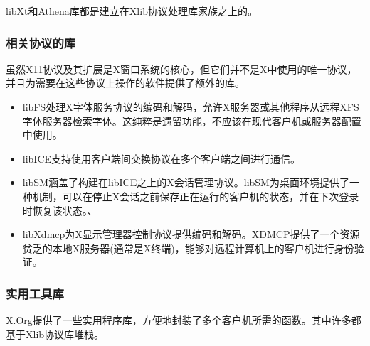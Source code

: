 \begin{note}
libXt和Athena库都是建立在Xlib协议处理库家族之上的。
\end{note}

\subsubsection{相关协议的库}

虽然X11协议及其扩展是X窗口系统的核心，但它们并不是X中使用的唯一协议，并且为需要在这些协议上操作的软件提供了额外的库。

\begin{itemize}
	\item libFS处理X字体服务协议的编码和解码，允许X服务器或其他程序从远程XFS字体服务器检索字体。这纯粹是遗留功能，不应该在现代客户机或服务器配置中使用。
	\item libICE支持使用客户端间交换协议在多个客户端之间进行通信。
	\item libSM涵盖了构建在libICE之上的X会话管理协议。libSM为桌面环境提供了一种机制，可以在停止X会话之前保存正在运行的客户机的状态，并在下次登录时恢复该状态。、
	\item libXdmcp为X显示管理器控制协议提供编码和解码。XDMCP提供了一个资源贫乏的本地X服务器(通常是X终端)，能够对远程计算机上的客户机进行身份验证。
\end{itemize}

\subsubsection{实用工具库}

X.Org提供了一些实用程序库，方便地封装了多个客户机所需的函数。其中许多都基于Xlib协议库堆栈。

